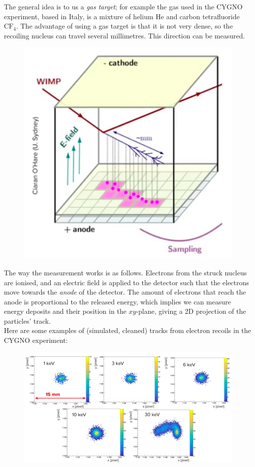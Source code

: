 The general idea is to us a \textit{gas target}; for example the gas used in the CYGNO experiment, based in Italy, is a mixture of helium $\textrm{He}$ and carbon tetrafluoride $\textrm{CF}_4$. The advantage of using a gas target is that it is not very dense, so the recoiling nucleus can travel several millimetres. This direction can be measured. 

\begin{figure}[H]
\centering
\includegraphics[scale=0.4]{gastank.png}
\end{figure}

The way the measurement works is as follows. Electrons from the struck nucleus are ionised, and an electric field is applied to the detector such that the electrons move towards the \textit{anode} of the detector. The amount of electrons that reach the anode is proportional to the released energy, which implies we can measure energy deposits and their position in the $xy$-plane, giving a 2D projection of the particles' track.\\
Here are some examples of (simulated, cleaned) tracks from electron recoils in the CYGNO experiment:
\begin{figure}[H]
\centering
\includegraphics[scale=0.4]{electrontracks.png}
\end{figure}


